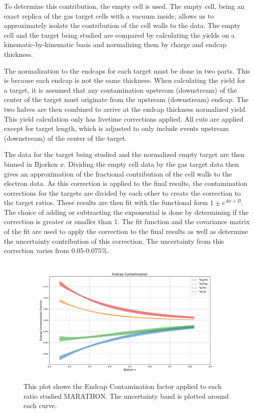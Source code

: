To determine this contribution, the empty cell is used. The empty cell, being an exact replica of the gas target cells with a vacuum inside, allows us to approximately isolate the contribution of the cell walls to the data. The empty cell and the target being studied are compared by calculating the yields on a kinematic-by-kinematic basis and normalizing them by charge and endcap thickness.

The normalization to the endcaps for each target must be done in two parts. This is because each endcap is not the same thickness. When calculating the yield for a target, it is assumed that any contamination upstream (downstream) of the center of the target must originate from the upstream (downstream) endcap. The two halves are then combined to arrive at the endcap thickness normalized yield. This yield calculation only has livetime corrections applied. All cuts are applied except for target length, which is adjusted to only include events upstream (downstream) of the center of the target.

The data for the target being studied and the normalized empty target are then binned in Bjorken $x$. Dividing the empty cell data by the gas target data then gives an approximation of the fractional contribution of the cell walls to the electron data. As this correction is applied to the final results, the contamination corrections for the targets are divided by each other to create the correction to the target ratios. These results are then fit with the functional form $1\pm e^{Ax+B}$. The choice of adding or subtracting the exponential is done by determining if the correction is greater or smaller than 1. The fit function and the covariance matrix of the fit are used to apply the correction to the final results as well as determine the uncertainty contribution of this correction. The uncertainty from this correction varies from $0.05$-$0.075\%$.

\begin{figure}
	\includegraphics[width=\textwidth]{./analysis/fig/ECC.pdf}
	\caption{This plot shows the Endcap Contamination factor applied to each ratio studied MARATHON. The uncertainty band is plotted around each curve.}
	\label{fig:deadtime}
\end{figure}

